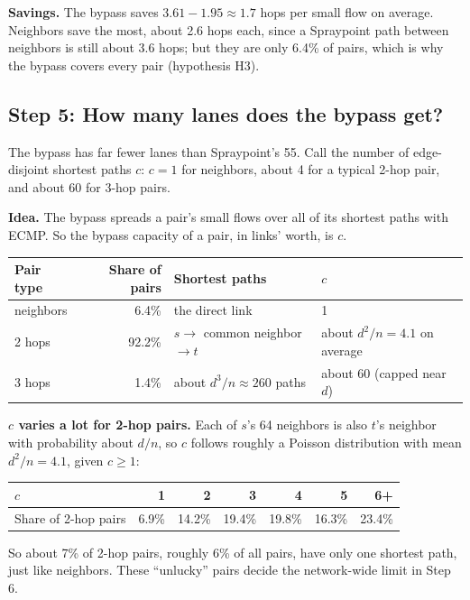 \textbf{Savings.} The bypass saves $3.61 - 1.95 \approx 1.7$ hops per small flow on average. Neighbors save the most, about 2.6 hops each, since a Spraypoint path between neighbors is still about 3.6 hops; but they are only 6.4\% of pairs, which is why the bypass covers every pair (hypothesis H3).

\subsection{Step 5: How many lanes does the bypass get?}

The bypass has far fewer lanes than Spraypoint's 55. Call the number of edge-disjoint shortest paths $c$: $c = 1$ for neighbors, about 4 for a typical 2-hop pair, and about 60 for 3-hop pairs.

\textbf{Idea.} The bypass spreads a pair's small flows over all of its shortest paths with ECMP. So the bypass capacity of a pair, in links' worth, is $c$.

\begin{center}
\begin{tabularx}{\linewidth}{@{}l r L L@{}}
\toprule
Pair type & Share of pairs & Shortest paths & $c$ \\
\midrule
neighbors & 6.4\% & the direct link & 1 \\
2 hops & 92.2\% & $s \to$ common neighbor $\to t$ & about $d^2/n = 4.1$ on average \\
3 hops & 1.4\% & about $d^3/n \approx 260$ paths & about 60 (capped near $d$) \\
\bottomrule
\end{tabularx}
\end{center}

\textbf{$c$ varies a lot for 2-hop pairs.} Each of $s$'s 64 neighbors is also $t$'s neighbor with probability about $d/n$, so $c$ follows roughly a Poisson distribution with mean $d^2/n = 4.1$, given $c \ge 1$:

\begin{center}
\begin{tabular}{@{}lrrrrrr@{}}
\toprule
$c$ & 1 & 2 & 3 & 4 & 5 & 6+ \\
\midrule
Share of 2-hop pairs & 6.9\% & 14.2\% & 19.4\% & 19.8\% & 16.3\% & 23.4\% \\
\bottomrule
\end{tabular}
\end{center}

So about 7\% of 2-hop pairs, roughly 6\% of all pairs, have only one shortest path, just like neighbors. These ``unlucky'' pairs decide the network-wide limit in Step 6.

